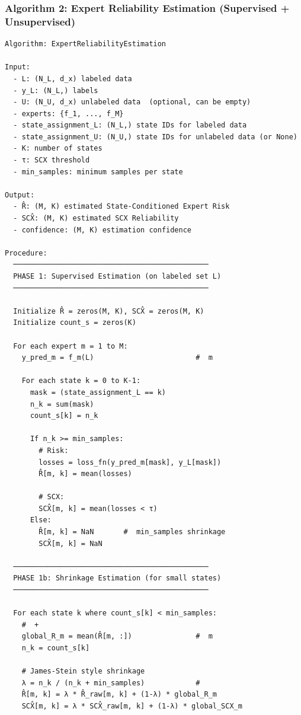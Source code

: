\documentclass[
  12pt,
]{article}
\begin{document}
\subsubsection{Algorithm 2: Expert Reliability Estimation (Supervised +
Unsupervised)}\label{algorithm-2-expert-reliability-estimation-supervised-unsupervised}

\begin{verbatim}
Algorithm: ExpertReliabilityEstimation

Input:
  - L: (N_L, d_x) labeled data
  - y_L: (N_L,) labels
  - U: (N_U, d_x) unlabeled data  (optional, can be empty)
  - experts: {f_1, ..., f_M}
  - state_assignment_L: (N_L,) state IDs for labeled data
  - state_assignment_U: (N_U,) state IDs for unlabeled data (or None)
  - K: number of states
  - τ: SCX threshold
  - min_samples: minimum samples per state

Output:
  - R̂: (M, K) estimated State-Conditioned Expert Risk
  - SCX̂: (M, K) estimated SCX Reliability
  - confidence: (M, K) estimation confidence

Procedure:
  ──────────────────────────────────────────────
  PHASE 1: Supervised Estimation (on labeled set L)
  ──────────────────────────────────────────────

  Initialize R̂ = zeros(M, K), SCX̂ = zeros(M, K)
  Initialize count_s = zeros(K)

  For each expert m = 1 to M:
    y_pred_m = f_m(L)                        #  m 

    For each state k = 0 to K-1:
      mask = (state_assignment_L == k)
      n_k = sum(mask)
      count_s[k] = n_k

      If n_k >= min_samples:
        # Risk: 
        losses = loss_fn(y_pred_m[mask], y_L[mask])
        R̂[m, k] = mean(losses)

        # SCX: 
        SCX̂[m, k] = mean(losses < τ)
      Else:
        R̂[m, k] = NaN       #  min_samples shrinkage
        SCX̂[m, k] = NaN

  ──────────────────────────────────────────────
  PHASE 1b: Shrinkage Estimation (for small states)
  ──────────────────────────────────────────────

  For each state k where count_s[k] < min_samples:
    #  + 
    global_R_m = mean(R̂[m, :])               #  m 
    n_k = count_s[k]

    # James-Stein style shrinkage
    λ = n_k / (n_k + min_samples)            # 
    R̂[m, k] = λ * R̂_raw[m, k] + (1-λ) * global_R_m
    SCX̂[m, k] = λ * SCX̂_raw[m, k] + (1-λ) * global_SCX_m


\end{verbatim}
\end{document}
